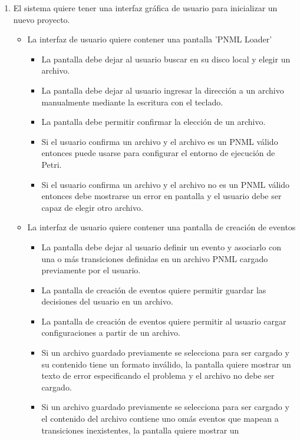 \begin{enumerate}
	\item El sistema quiere tener una interfaz gráfica de usuario para inicializar
	un nuevo proyecto.
	\begin{itemize}
	    \item La interfaz de usuario quiere contener una pantalla 'PNML Loader'
	    	\begin{itemize}
	    	    \item La pantalla debe dejar al usuario buscar en su disco local y
	    	    elegir un archivo.
	    	    \item La pantalla debe dejar al usuario ingresar la dirección a un
	    	    archivo manualmente mediante la escritura con el teclado.
	    	    \item La pantalla debe permitir confirmar la elección de un archivo.
	    	    \item Si el usuario confirma un archivo y el archivo es un PNML válido
	    	    entonces puede usarse para configurar el entorno de ejecución de
	    	    Petri.
	    	    \item Si el usuario confirma un archivo y el archivo no es un PNML
	    	    válido entonces debe mostrarse un error en pantalla y el usuario debe
	    	    ser capaz de elegir otro archivo.
	    	\end{itemize}
	    \item La interfaz de usuario quiere contener una pantalla de creación de
	    eventos
	    \begin{itemize}
	    	    \item La pantalla debe dejar al usuario definir un evento y asociarlo
	    	    con una o más transiciones definidas en un archivo PNML cargado
	    	    previamente por el usuario.
	    	    \item La pantalla de creación de eventos quiere permitir guardar las
	    	    decisiones del usuario en un archivo.
	    	    \item La pantalla de creación de eventos quiere permitir al usuario
	    	    cargar configuraciones a partir de un archivo.
	    	    \item Si un archivo guardado previamente se selecciona para ser
	    	    cargado y su contenido tiene un formato inválido, la pantalla
	    	    quiere mostrar un texto de error especificando el problema y el
	    	    archivo no debe ser cargado.
	    	    \item Si un archivo guardado previamente se selecciona para ser
	    	    cargado y el contenido del archivo contiene uno omás eventos que
	    	    mapean a transiciones inexistentes, la pantalla quiere mostrar un

\end{itemize}
\end{itemize}
\end{enumerate}
